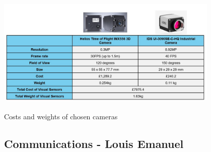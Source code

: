 \documentclass[11pt]{article}		%
\newcommand{\supercite}[1]{\textsuperscript{\cite{#1}}}		%
\begin{document}
				\begin{table}[H]
			  		\centering
			  		\includegraphics[width=0.8\textwidth]{cameracosts.jpg}
					\caption{Costs and weights of chosen cameras\supercite{camera}\supercite{camera2}}
					\label{cameracost}
				\end{table}
		
		\subsection[Communications]{Communications - Louis Emanuel}
\end{document}
